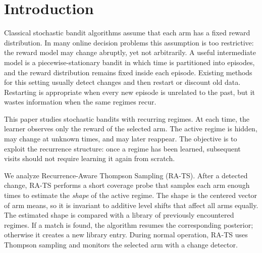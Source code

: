 \documentclass[11pt]{article}
\begin{document}
\section{Introduction}

Classical stochastic bandit algorithms assume that each arm has a fixed reward distribution. In many online decision problems this assumption is too restrictive: the reward model may change abruptly, yet not arbitrarily. A useful intermediate model is a piecewise-stationary bandit in which time is partitioned into episodes, and the reward distribution remains fixed inside each episode. Existing methods for this setting usually detect changes and then restart or discount old data. Restarting is appropriate when every new episode is unrelated to the past, but it wastes information when the same regimes recur.

This paper studies stochastic bandits with recurring regimes. At each time, the learner observes only the reward of the selected arm. The active regime is hidden, may change at unknown times, and may later reappear. The objective is to exploit the recurrence structure: once a regime has been learned, subsequent visits should not require learning it again from scratch.

We analyze Recurrence-Aware Thompson Sampling (RA-TS). After a detected change, RA-TS performs a short coverage probe that samples each arm enough times to estimate the \emph{shape} of the active regime. The shape is the centered vector of arm means, so it is invariant to additive level shifts that affect all arms equally. The estimated shape is compared with a library of previously encountered regimes. If a match is found, the algorithm resumes the corresponding posterior; otherwise it creates a new library entry. During normal operation, RA-TS uses Thompson sampling and monitors the selected arm with a change detector.
\end{document}
